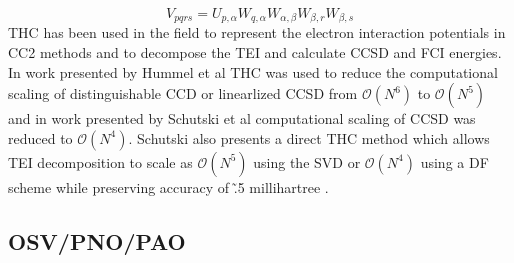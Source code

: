 			\begin{equation}
				V_{pqrs} = U_{p, \alpha} W_{q, \alpha} W_{\alpha, \beta} W_{\beta, r} W_{\beta, s}
			\end{equation}
		THC has been used in the field to represent the electron interaction potentials in CC2 methods and to decompose the TEI and calculate CCSD and FCI energies. In work presented by Hummel et al \cite{Hummel} THC was used to reduce the computational scaling of distinguishable CCD or linearlized CCSD from $\mathcal{O}(N^6)$ to $\mathcal{O}(N^5)$ and in work presented by Schutski et al\cite{Schutski} computational scaling of CCSD was reduced to $\mathcal{O}(N^4)$.  Schutski also presents a direct THC method which allows TEI decomposition to scale as $\mathcal{O}(N^5)$ using the SVD or $\mathcal{O}(N^4)$ using a DF scheme while preserving accuracy of \~.5 millihartree .

	\subsection{OSV/PNO/PAO}%


